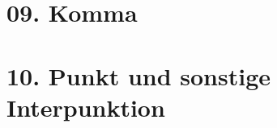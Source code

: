 \documentclass[handout,aspectratio=1610,dvipsnames]{beamer}
\begin{document}
  \section{09. Komma}
  \let\woopsi\section\let\section\subsection\let\subsection\subsubsection
  
  \let\subsection\section\let\section\woopsi
  
  \section{10. Punkt und sonstige Interpunktion}
  \let\woopsi\section\let\section\subsection\let\subsection\subsubsection
  
  \let\subsection\section\let\section\woopsi
\fi
\end{document}
